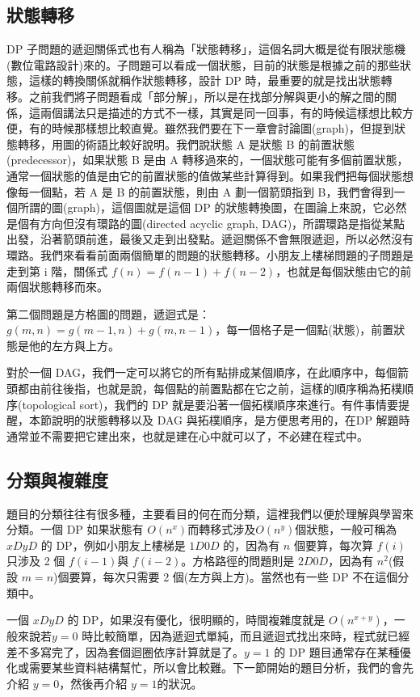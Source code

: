 \documentclass[a4paper, 11pt, oneside]{book}
\begin{document}
\subsection{狀態轉移}
DP 子問題的遞迴關係式也有人稱為「狀態轉移」，這個名詞大概是從有限狀態機(數位電路設計)來的。子問題可以看成一個狀態，目前的狀態是根據之前的那些狀態，這樣的轉換關係就稱作狀態轉移，設計 DP 時，最重要的就是找出狀態轉移。之前我們將子問題看成「部分解」，所以是在找部分解與更小的解之間的關係，這兩個講法只是描述的方式不一樣，其實是同一回事，有的時候這樣想比較方便，有的時候那樣想比較直覺。雖然我們要在下一章會討論圖(graph)，但提到狀態轉移，用圖的術語比較好說明。我們說狀態 A 是狀態 B 的前置狀態(predecessor)，如果狀態 B 是由 A 轉移過來的，一個狀態可能有多個前置狀態，通常一個狀態的值是由它的前置狀態的值做某些計算得到。如果我們把每個狀態想像每一個點，若 A 是 B 的前置狀態，則由 A 劃一個箭頭指到 B，我們會得到一個所謂的圖(graph)，這個圖就是這個 DP 的狀態轉換圖，在圖論上來說，它必然是個有方向但沒有環路的圖(directed acyclic graph, DAG)，所謂環路是指從某點出發，沿著箭頭前進，最後又走到出發點。遞迴關係不會無限遞迴，所以必然沒有環路。我們來看看前面兩個簡單的問題的狀態轉移。小朋友上樓梯問題的子問題是走到第 i 階，關係式 $f(n)=f(n-1)+f(n-2)$，也就是每個狀態由它的前兩個狀態轉移而來。

第二個問題是方格圖的問題，遞迴式是：$g(m,n)=g(m-1,n)+g(m,n-1)$，每一個格子是一個點(狀態)，前置狀態是他的左方與上方。

對於一個 DAG，我們一定可以將它的所有點排成某個順序，在此順序中，每個箭頭都由前往後指，也就是說，每個點的前置點都在它之前，這樣的順序稱為拓樸順序(topological sort)，我們的 DP 就是要沿著一個拓樸順序來進行。有件事情要提醒，本節說明的狀態轉移以及 DAG 與拓樸順序，是方便思考用的，在DP 解題時通常並不需要把它建出來，也就是建在心中就可以了，不必建在程式中。

\subsection{分類與複雜度}
題目的分類往往有很多種，主要看目的何在而分類，這裡我們以便於理解與學習來分類。一個 DP 如果狀態有 $O(n^x)$而轉移式涉及$O(n^y)$個狀態，一般可稱為 $xDyD$ 的 DP，例如小朋友上樓梯是 $1D0D$ 的，因為有 $n$ 個要算，每次算 $f(i)$只涉及 2 個 $f(i-1)$與 $f(i-2)$。方格路徑的問題則是 $2D0D$，因為有 $n^2$(假設 $m=n$)個要算，每次只需要 2 個(左方與上方)。當然也有一些 DP 不在這個分類中。

一個 $xDyD$ 的 DP，如果沒有優化，很明顯的，時間複雜度就是 $O(n^{x+y})$，一般來說若$y=0$ 時比較簡單，因為遞迴式單純，而且遞迴式找出來時，程式就已經差不多寫完了，因為套個迴圈依序計算就是了。$y=1$ 的 DP 題目通常存在某種優化或需要某些資料結構幫忙，所以會比較難。下一節開始的題目分析，我們的會先介紹 $y=0$，然後再介紹 $y=1$的狀況。
\end{document}
